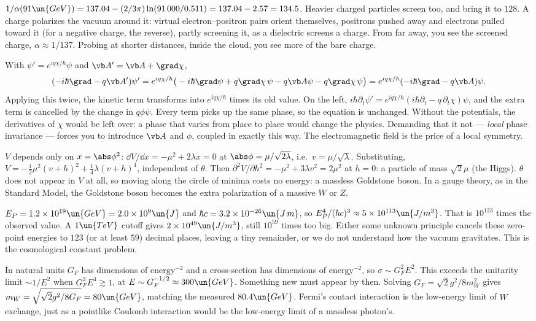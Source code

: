  $1/\alpha(91\un{GeV}) = 137.04 - (2/3\pi)\ln(91\,000/0.511) = 137.04 - 2.57 = 134.5$. Heavier charged particles screen too, and bring it to $128$. A charge polarizes the vacuum around it: virtual electron--positron pairs orient themselves, positrons pushed away and electrons pulled toward it (for a negative charge, the reverse), partly screening it, as a dielectric screens a charge. From far away, you see the screened charge, $\alpha\approx1/137$. Probing at shorter distances, inside the cloud, you see more of the bare charge.

 With $\psi' = e^{iq\chi/\hbar}\psi$ and $\vb A' = \vb A+\grad\chi$,
\[
  (-i\hbar\grad - q\vb A')\psi' = e^{iq\chi/\hbar}\big(-i\hbar\grad\psi + q\grad\chi\,\psi - q\vb A\psi - q\grad\chi\,\psi\big) = e^{iq\chi/\hbar}(-i\hbar\grad - q\vb A)\psi.
\]
Applying this twice, the kinetic term transforms into $e^{iq\chi/\hbar}$ times its old value. On the left, $i\hbar\partial_t\psi' = e^{iq\chi/\hbar}(i\hbar\partial_t - q\,\partial_t\chi)\psi$, and the extra term is cancelled by the change in $q\phi\psi$. Every term picks up the same phase, so the equation is unchanged. Without the potentials, the derivatives of $\chi$ would be left over: a phase that varies from place to place would change the physics. Demanding that it not --- \emph{local} phase invariance --- forces you to introduce $\vb A$ and $\phi$, coupled in exactly this way. The electromagnetic field is the price of a local symmetry.

 $V$ depends only on $x = \abs\phi^2$: $\dd V/\dd x = -\mu^2+2\lambda x = 0$ at $\abs\phi = \mu/\sqrt{2\lambda}$, i.e.\ $v = \mu/\sqrt\lambda$. Substituting, $V = -\tfrac12\mu^2(v+h)^2 + \tfrac14\lambda(v+h)^4$, independent of $\theta$. Then $\partial^2V/\partial h^2 = -\mu^2 + 3\lambda v^2 = 2\mu^2$ at $h = 0$: a particle of mass $\sqrt2\mu$ (the Higgs). $\theta$ does not appear in $V$ at all, so moving along the circle of minima costs no energy: a massless Goldstone boson. In a gauge theory, as in the Standard Model, the Goldstone boson becomes the extra polarization of a massive $W$ or $Z$.

 $E_P = 1.2\times10^{19}\un{GeV} = 2.0\times10^9\un{J}$ and $\hbar c = 3.2\times10^{-26}\un{J\,m}$, so $E_P^4/(\hbar c)^3\approx5\times10^{113}\un{J/m^3}$. That is $10^{123}$ times the observed value. A $1\un{TeV}$ cutoff gives $2\times10^{49}\un{J/m^3}$, still $10^{59}$ times too big. Either some unknown principle cancels these zero-point energies to $123$ (or at least $59$) decimal places, leaving a tiny remainder, or we do not understand how the vacuum gravitates. This is the cosmological constant problem.

 In natural units $G_F$ has dimensions of $\text{energy}^{-2}$ and a cross-section has dimensions of $\text{energy}^{-2}$, so $\sigma\sim G_F^2E^2$. This exceeds the unitarity limit $\sim1/E^2$ when $G_F^2E^4\gtrsim1$, at $E\sim G_F^{-1/2}\approx300\un{GeV}$. Something new must appear by then. Solving $G_F = \sqrt2g^2/8m_W^2$ gives $m_W = \sqrt{\sqrt2g^2/8G_F} = 80\un{GeV}$, matching the measured $80.4\un{GeV}$. Fermi's contact interaction is the low-energy limit of $W$ exchange, just as a pointlike Coulomb interaction would be the low-energy limit of a massless photon's.
